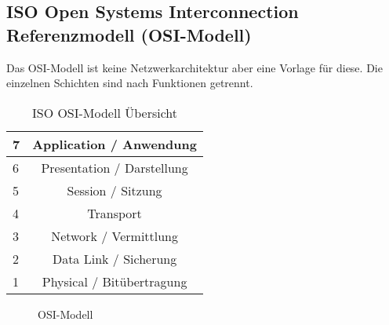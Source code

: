 \subsection{ISO Open Systems Interconnection Referenzmodell (OSI-Modell)}

Das OSI-Modell ist keine Netzwerkarchitektur aber eine Vorlage für diese. Die einzelnen Schichten sind nach Funktionen getrennt.

\begin{table}[H]
    \centering
    \begin{tabular}{|l|c|}
        \hline
        7 & Application / Anwendung    \\\hline
        6 & Presentation / Darstellung \\\hline
        5 & Session / Sitzung          \\\hline
        4 & Transport                  \\\hline
        3 & Network / Vermittlung      \\\hline
        2 & Data Link / Sicherung      \\\hline
        1 & Physical / Bitübertragung  \\\hline
    \end{tabular}
    \caption{ISO OSI-Modell Übersicht}
\end{table}

\begin{figure}[H]
    \centering
    
    \caption{OSI-Modell}
\end{figure}
\FloatBarrier


